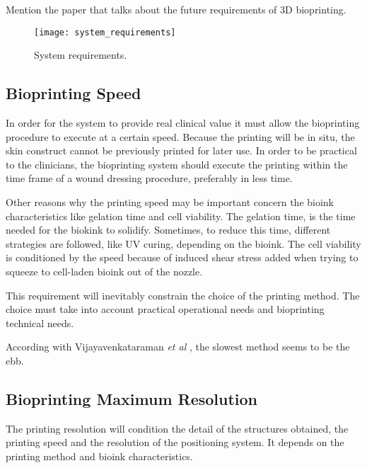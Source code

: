 {\color{red}Mention the paper that talks about the future requirements of 3D bioprinting.}

\begin{figure}[htbp]
	\centering
	\texttt{[image: system\_requirements]}
	\caption{System requirements.}
	\label{fig:system_requirements}
\end{figure}

\subsection{Bioprinting Speed}
\label{subsec:system_architecture_requirements_bioprinting_speed}

In order for the system to provide real clinical value it must allow the bioprinting procedure to execute at a certain speed. Because the printing will be in situ, the skin construct cannot be previously printed for later use. In order to be practical to the clinicians, the bioprinting system should execute the printing within the time frame of a wound dressing procedure, preferably in less time.

Other reasons why the printing speed may be important concern the bioink characteristics like gelation time and cell viability. The gelation time, is the time needed for the biokink to solidify. Sometimes, to reduce this time, different strategies are followed, like UV curing, depending on the bioink. The cell viability is conditioned by the speed because of induced shear stress added when trying to squeeze to cell-laden bioink out of the nozzle. 

This requirement will inevitably constrain the choice of the printing method. The choice must take into account practical operational needs and bioprinting technical needs.

According with Vijayavenkataraman \textit{et al} \cite{Vijayavenkataraman2018_bioprinting_tissues_organs_regen_med}, the slowest method seems to be the \gls{ebb}.


\subsection{Bioprinting Maximum Resolution}
\label{subsec:system_architecture_requirements_bioprinting_max_resolution}

The printing resolution will condition the detail of the structures obtained, the printing speed and the resolution of the positioning system. It depends on the printing method and bioink characteristics.

